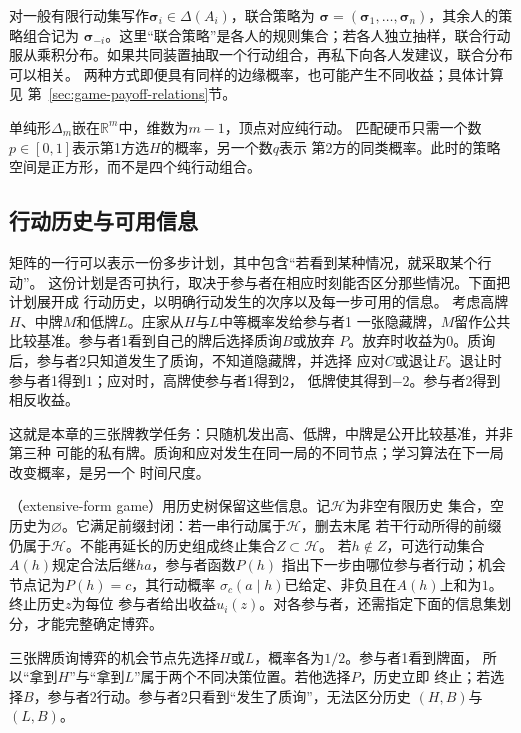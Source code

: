 对一般有限行动集写作\(\bm\sigma_i\in\Delta(A_i)\)，联合策略为
\(\bm\sigma=(\bm\sigma_1,\ldots,\bm\sigma_n)\)，其余人的策略组合记为
\(\bm\sigma_{-i}\)。这里“联合策略”是各人的规则集合；若各人独立抽样，联合行动
服从乘积分布。如果共同装置抽取一个行动组合，再私下向各人发建议，联合分布可以相关。
两种方式即便具有同样的边缘概率，也可能产生不同收益；具体计算见
第~\ref{sec:game-payoff-relations}节。

单纯形\(\Delta_m\)嵌在\(\mathbb R^m\)中，维数为\(m-1\)，顶点对应纯行动。
匹配硬币只需一个数\(p\in[0,1]\)表示第1方选\(H\)的概率，另一个数\(q\)表示
第2方的同类概率。此时的策略空间是正方形，而不是四个纯行动组合。

\subsection{行动历史与可用信息}
\label{sec:game-extensive-information}

矩阵的一行可以表示一份多步计划，其中包含“若看到某种情况，就采取某个行动”。
这份计划是否可执行，取决于参与者在相应时刻能否区分那些情况。下面把计划展开成
行动历史，以明确行动发生的次序以及每一步可用的信息。
考虑高牌\(H\)、中牌\(M\)和低牌\(L\)。庄家从\(H\)与\(L\)中等概率发给参与者1
一张隐藏牌，\(M\)留作公共比较基准。参与者1看到自己的牌后选择质询\(B\)或放弃
\(P\)。放弃时收益为\(0\)。质询后，参与者2只知道发生了质询，不知道隐藏牌，并选择
应对\(C\)或退让\(F\)。退让时参与者1得到\(1\)；应对时，高牌使参与者1得到\(2\)，
低牌使其得到\(-2\)。参与者2得到相反收益。

这就是本章的三张牌教学任务：只随机发出高、低牌，中牌是公开比较基准，并非第三种
可能的私有牌。质询和应对发生在同一局的不同节点；学习算法在下一局改变概率，是另一个
时间尺度。
\begin{definition}[有限扩展式博弈的历史树]
\label{def:game-finite-extensive-history}
（extensive-form game）用历史树保留这些信息。记\(\mathcal H\)为非空有限历史
集合，空历史为\(\varnothing\)。它满足前缀封闭：若一串行动属于\(\mathcal H\)，删去末尾
若干行动所得的前缀仍属于\(\mathcal H\)。不能再延长的历史组成终止集合\(Z\subset\mathcal H\)。
若\(h\notin Z\)，可选行动集合\(A(h)\)规定合法后继\(ha\)，参与者函数\(P(h)\)
指出下一步由哪位参与者行动；机会节点记为\(P(h)=c\)，其行动概率
\(\sigma_c(a\mid h)\)已给定、非负且在\(A(h)\)上和为\(1\)。终止历史\(z\)为每位
参与者给出收益\(u_i(z)\)。对各参与者，还需指定下面的信息集划分，才能完整确定博弈。
\end{definition}

三张牌质询博弈的机会节点先选择\(H\)或\(L\)，概率各为\(1/2\)。参与者1看到牌面，
所以“拿到\(H\)”与“拿到\(L\)”属于两个不同决策位置。若他选择\(P\)，历史立即
终止；若选择\(B\)，参与者2行动。参与者2只看到“发生了质询”，无法区分历史
\((H,B)\)与\((L,B)\)。


